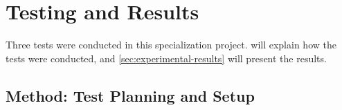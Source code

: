 \chapter{Testing and Results}
\label{cha:experiments}

Three tests were conducted in this specialization project.  will explain how the tests were conducted, and \autoref{sec:experimental-results} will present the results.

\section{Method: Test Planning and Setup}
\label{sec:experimental-plan-and-setup}


